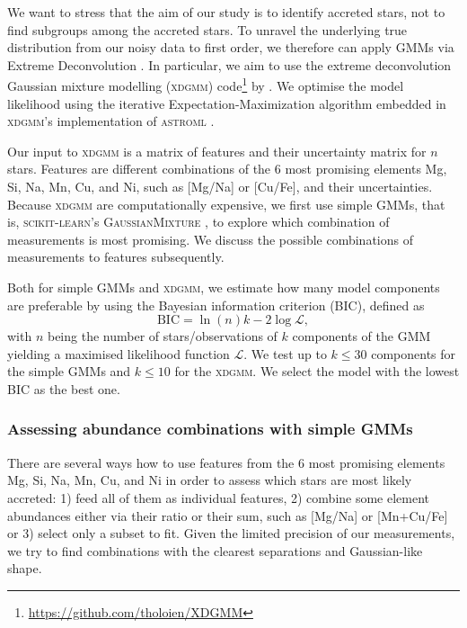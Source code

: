 \documentclass[fleqn,usenatbib]{mnras}
\begin{document}
We want to stress that the aim of our study is to identify accreted stars, not to find subgroups among the accreted stars. To unravel the underlying true distribution from our noisy data to first order, we therefore can apply GMMs via Extreme Deconvolution \citep[XD,][]{Bovy2011}. In particular, we aim to use the extreme deconvolution Gaussian mixture modelling (\textsc{xdgmm}) code\footnote{\url{https://github.com/tholoien/XDGMM}} by \citet{Holoien2017}. We optimise the model likelihood using the iterative Expectation-Maximization algorithm \citep{Dempster1977} embedded in \textsc{xdgmm}'s implementation of \textsc{astroml} \citep{astroml}.

Our input to \textsc{xdgmm} is a matrix of features and their uncertainty matrix for $n$ stars. Features are different combinations of the 6 most promising elements Mg, Si, Na, Mn, Cu, and Ni, such as [Mg/Na] or [Cu/Fe], and their uncertainties. Because \textsc{xdgmm} are computationally expensive, we first use simple GMMs, that is, \textsc{scikit-learn}'s \textsc{GaussianMixture} \citep{scikit-learn}, to explore which combination of measurements is most promising. We discuss the possible combinations of measurements to features subsequently.

Both for simple GMMs and \textsc{xdgmm}, we estimate how many model components are preferable by using the Bayesian information criterion (BIC)\citep{Schwarz1978}, defined as 
\begin{equation}
\text{BIC} = \ln (n) k - 2 \log \mathcal{L},
\end{equation}
with $n$ being the number of stars/observations of $k$ components of the GMM yielding a maximised likelihood function $\mathcal{L}$. We test up to $k \leq 30$ components for the simple GMMs and $k \leq 10$ for the \textsc{xdgmm}. We select the model with the lowest BIC as the best one.

\subsubsection{Assessing abundance combinations with simple GMMs} \label{sec:sample_gmm}

There are several ways how to use features from the 6 most promising elements Mg, Si, Na, Mn, Cu, and Ni in order to assess which stars are most likely accreted: 1) feed all of them as individual features, 2) combine some element abundances either via their ratio or their sum, such as [Mg/Na] or [Mn+Cu/Fe] or 3) select only a subset to fit. Given the limited precision of our measurements, we try to find combinations with the clearest separations and Gaussian-like shape.
\end{document}
